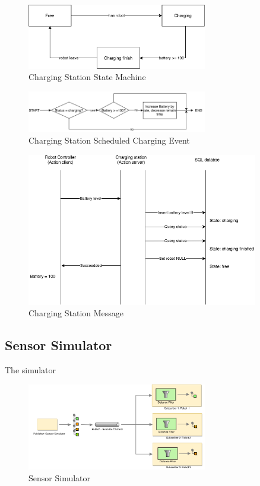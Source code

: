 \begin{figure}[htbp]
    \centering
    \includegraphics[width = 0.7\textwidth]{content/images/ch4/charging_station_state_machine.drawio.png}
    \caption{Charging Station State Machine}
    \label{fig:charging_station_state_machine}
\end{figure}

\begin{figure}[htbp]
    \centering
    \includegraphics[width = 0.7\textwidth]{content/images/ch4/charging_station_charging_event.drawio.png}
    \caption{Charging Station Scheduled Charging Event}
    \label{fig:charging_station_event}
\end{figure}

\begin{figure}[htbp]
    \centering
    \includegraphics[width = 0.9\textwidth]{content/images/ch4/charging_station_message.drawio.png}
    \caption{Charging Station Message}
    \label{fig:charging_station_message}
\end{figure}

\subsection{Sensor Simulator}



\label{sec:sensor_simulatior}
The simulator 

\begin{figure}[htbp]
    \centering
    \includegraphics[width = 0.7\textwidth]{content/images/ch4/sensor_simulator.drawio.png}
    \caption{Sensor Simulator}
    \label{}
\end{figure}